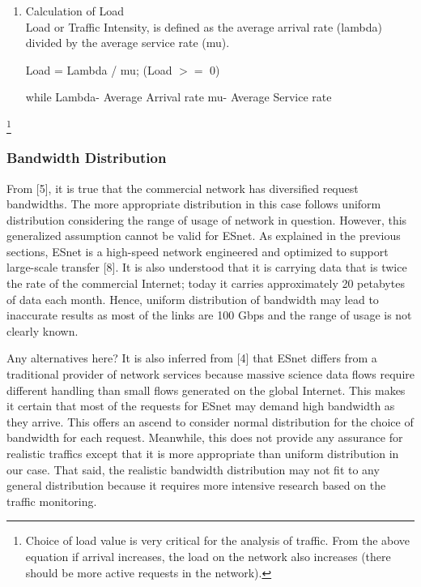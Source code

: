\begin{enumerate}[label=(\alph*),leftmargin=*]
\item Calculation of Load \\
Load or Traffic Intensity, is defined as the average arrival rate (lambda) divided by the average service rate (mu).

Load = Lambda / mu; (Load $>=$ 0)

while	 Lambda- Average Arrival rate
mu- Average Service rate
\end{enumerate}	

\footnote {Choice of load value is very critical for the analysis of traffic. From the above equation if arrival increases, the load on the network also increases (there should be more active requests in the network).} 

\subsubsection{ Bandwidth Distribution}
From [5], it is true that the commercial network has diversified request bandwidths. The more appropriate distribution in this case follows uniform distribution considering the range of usage of network in question. However, this generalized assumption cannot be valid for ESnet. As explained in the previous sections, ESnet is a high-speed network engineered and optimized to support large-scale transfer [8]. It is also understood that it is carrying data that is twice the rate of the commercial Internet; today it carries approximately 20 petabytes of data each month.  Hence, uniform distribution of bandwidth may lead to inaccurate results as most of the links are 100 Gbps and the range of usage is not clearly known. 

\indent Any alternatives here? It is also inferred from [4] that ESnet differs from a traditional provider of network services because massive science data flows require different handling than small flows generated on the global Internet. This makes it certain that most of the requests for ESnet may demand high bandwidth as they arrive. This offers an ascend to consider normal distribution for the choice of bandwidth for each request. Meanwhile, this does not provide any assurance for realistic traffics except that it is more appropriate than uniform distribution in our case. That said, the realistic bandwidth distribution may not fit to any general distribution because it requires more intensive research based on the traffic monitoring.


